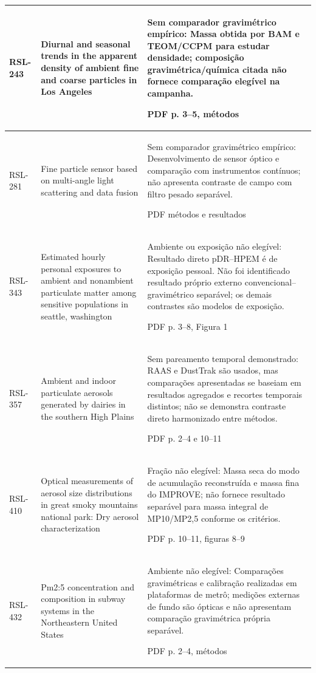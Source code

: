 \begin{longtable}{|P{0.11\textwidth}|P{0.28\textwidth}|P{\arrayrulewidth\relax}|}
RSL-243 & Diurnal and seasonal trends in the apparent density of ambient fine and coarse particles in Los Angeles & Sem comparador gravimétrico empírico: Massa obtida por BAM e TEOM/CCPM para estudar densidade; composição gravimétrica/química citada não fornece comparação elegível na campanha.\par\medskip PDF p. 3--5, métodos\\\hline
RSL-281 & Fine particle sensor based on multi-angle light scattering and data fusion & Sem comparador gravimétrico empírico: Desenvolvimento de sensor óptico e comparação com instrumentos contínuos; não apresenta contraste de campo com filtro pesado separável.\par\medskip PDF métodos e resultados\\\hline
RSL-343 & Estimated hourly personal exposures to ambient and nonambient particulate matter among sensitive populations in seattle, washington & Ambiente ou exposição não elegível: Resultado direto pDR--HPEM é de exposição pessoal. Não foi identificado resultado próprio externo convencional--gravimétrico separável; os demais contrastes são modelos de exposição.\par\medskip PDF p. 3--8, Figura 1\\\hline
RSL-357 & Ambient and indoor particulate aerosols generated by dairies in the southern High Plains & Sem pareamento temporal demonstrado: RAAS e DustTrak são usados, mas comparações apresentadas se baseiam em resultados agregados e recortes temporais distintos; não se demonstra contraste direto harmonizado entre métodos.\par\medskip PDF p. 2--4 e 10--11\\\hline
RSL-410 & Optical measurements of aerosol size distributions in great smoky mountains national park: Dry aerosol characterization & Fração não elegível: Massa seca do modo de acumulação reconstruída e massa fina do IMPROVE; não fornece resultado separável para massa integral de MP10/MP2,5 conforme os critérios.\par\medskip PDF p. 10--11, figuras 8--9\\\hline
RSL-432 & Pm2:5 concentration and composition in subway systems in the Northeastern United States & Ambiente não elegível: Comparações gravimétricas e calibração realizadas em plataformas de metrô; medições externas de fundo são ópticas e não apresentam comparação gravimétrica própria separável.\par\medskip PDF p. 2--4, métodos\\\hline
\end{longtable}
\endgroup

